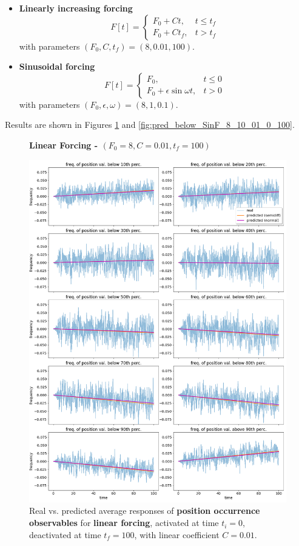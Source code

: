 \documentclass{article}
\begin{document}
\begin{itemize}	
	\item \textbf{Linearly increasing forcing}
	\begin{equation}
	F[t]=\left\{\begin{array}{ll}{F_0 + C t,} & {t \leq t_f} \\ {F_0 + C t_f,} & {t > t_f}\end{array}\right.
	\end{equation}
	with parameters $(F_0, C, t_f) = (8, 0.01, 100)$.
	\item \textbf{Sinusoidal forcing}
	\begin{equation}
	F[t]=\left\{\begin{array}{ll}{F_0,} & {t \leq 0} \\ {F_0 + \epsilon\sin{\omega t},} & {t > 0}\end{array}\right.
	\end{equation}
	with parameters $(F_0, \epsilon, \omega) = (8, 1, 0.1)$.
\end{itemize}
Results are shown in Figures \ref{fig:pred_position_below_LF_8_001_0_100} and \ref{fig:pred_below_SinF_8_10_01_0_100}.

\begin{figure}[!htb]
	\centering
	\textbf{Linear Forcing - $(F_0=8, C=0.01, t_f=100)$}\par\medskip
	\includegraphics[width=0.9\linewidth]{fig/pred_position_below_LF_8_001_0_100.png}
	\caption{Real vs. predicted average responses of \textbf{position occurrence observables} for \textbf{linear forcing}, activated at time $t_i=0$, deactivated at time $t_f=100$, with linear coefficient $C=0.01$.}
	\label{fig:pred_position_below_LF_8_001_0_100}
\end{figure}
\end{document}
